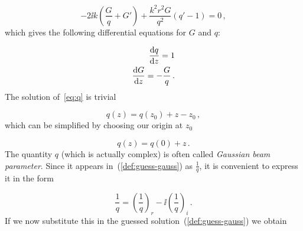 \documentclass[12pt, class=report, crop=false]{standalone}
\begin{document}
\begin{equation}
  -2 \ii k \left(\frac{G}{q} + G' \right) + \frac{k^2 r^2 G}{q^2} (q'-1) = 0\,,
\end{equation}
which gives the following differential equations for \(G\) and \(q\):

\begin{subequations}
  \begin{align}
    \label{eq:q}
    \dv{q}{z} = 1 \\
    \label{eq:G}
    \dv{G}{z} = -\frac{G}{q} \,.
  \end{align}
\end{subequations}
The solution of~\cref{eq:q} is trivial

\begin{equation*}
  q(z) = q(z_0) + z - z_0 \,,
\end{equation*}
which can be simplified by choosing our origin at \(z_0\)

\begin{equation}
  \label{sol:q}
  q(z) = q (0)+z\,.
\end{equation}
The quantity \(q\) (which is actually complex) is often called \textit{Gaussian beam parameter}. Since it appears in~(\ref{def:guess-gauss}) as \(\frac{1}{q}\), it is convenient to express it in the form

\begin{equation}
  \frac{1}{q} = \left(\frac{1}{q} \right)_r - \ii \left(\frac{1}{q} \right)_i\,.
\end{equation}
If we now substitute this in the guessed solution~(\ref{def:guess-gauss}) we obtain
\end{document}
